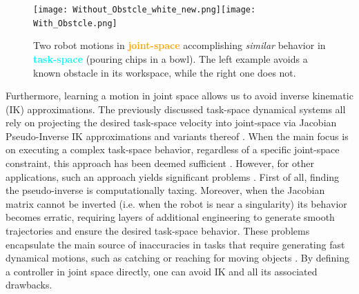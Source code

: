 \documentclass[letterpaper, 10 pt, conference,fleqn]{ieeeconf}
\begin{document}
\begin{figure}[t]
\centering
\texttt{[image: Without\_Obstcle\_white\_new.png]}\texttt{[image: With\_Obstcle.png]}
\caption{Two robot motions in \textcolor{orange}{\textbf{joint-space}} accomplishing \textit{similar} behavior in \textcolor{cyan}{\textbf{task-space}} (pouring chips in a bowl). The left example avoids a known obstacle in its workspace, while the right one does not.}
\label{fig:robot_example}
\vspace{-20pt}
\end{figure}

Furthermore, learning a motion in joint space allows us to avoid inverse kinematic (IK) approximations. The previously discussed task-space dynamical systems all rely on projecting the desired task-space velocity into joint-space via Jacobian Pseudo-Inverse IK approximations and variants thereof \cite{kelly2006control}. When the main focus is on executing a complex task-space behavior, regardless of a specific joint-space constraint, this approach has been deemed sufficient \cite{figueroa2016HRIrolling,ureche2015taskconst}. However, for other applications, such an approach yields significant problems \cite{buss2004introduction}. First of all, finding the pseudo-inverse is computationally taxing. Moreover, when the Jacobian matrix cannot be inverted (i.e. when the robot is near a singularity) its behavior becomes erratic, requiring layers of additional engineering to generate smooth trajectories and ensure the desired task-space behavior. These problems encapsulate the main source of inaccuracies in tasks that require generating fast dynamical motions, such as catching or reaching for moving objects \cite{7439839,Salehian-RSS-16}. By defining a controller in joint space directly, one can avoid IK and all its associated drawbacks.
\end{document}
